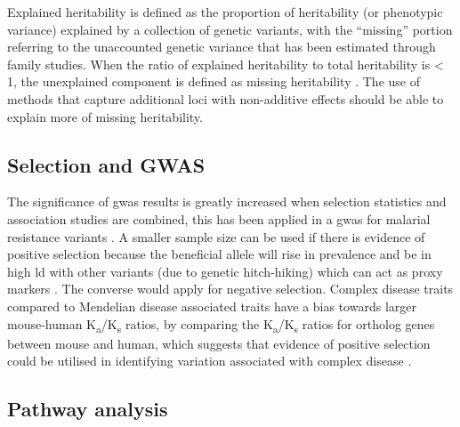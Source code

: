 \documentclass[twoside,openright]{report}
\begin{document}
Explained heritability is defined as the proportion of heritability (or
phenotypic variance) explained by a collection of genetic variants, with
the ``missing'' portion referring to the unaccounted genetic variance
that has been estimated through family studies. When the ratio of
explained heritability to total heritability is \textless{} 1, the
unexplained component is defined as missing heritability
\citep{Zuk2012}. The use of methods that capture additional loci with
non-additive effects should be able to explain more of missing
heritability.

\subsection{Selection and GWAS}\label{selection-and-gwas}

The significance of \gls{gwas} results is greatly increased when
selection statistics and association studies are combined, this has been
applied in a \gls{gwas} for malarial resistance variants
\citep{Ayodo2007}. A smaller sample size can be used if there is
evidence of positive selection because the beneficial allele will rise
in prevalence and be in high \gls{ld} with other variants (due to
genetic hitch-hiking) which can act as proxy markers
\citep{Karlsson2014}. The converse would apply for negative selection.
Complex disease traits compared to Mendelian disease associated traits
have a bias towards larger mouse-human
K\textsubscript{a}/K\textsubscript{s} ratios, by comparing the
K\textsubscript{a}/K\textsubscript{s} ratios for ortholog genes between
mouse and human, which suggests that evidence of positive selection
could be utilised in identifying variation associated with complex
disease \citep{Thomas2004}.

\subsection{Pathway analysis}\label{pathway-analysis}
\end{document}
